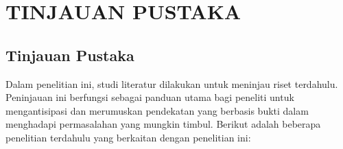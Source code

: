\newpage
\chapter{TINJAUAN PUSTAKA} \label{Bab II}

\section{Tinjauan Pustaka} \label{II.Tinjauan}
Dalam penelitian ini, studi literatur dilakukan untuk meninjau riset 
terdahulu. Peninjauan ini berfungsi sebagai panduan utama bagi peneliti 
untuk mengantisipasi dan merumuskan pendekatan yang berbasis bukti dalam 
menghadapi permasalahan yang mungkin timbul. Berikut adalah beberapa 
penelitian terdahulu yang berkaitan dengan penelitian ini: \par

